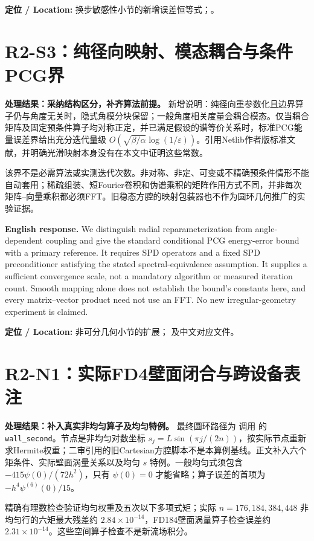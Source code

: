 \noindent\textbf{定位 / Location:} 换步敏感性小节的新增误差恒等式；。

\section{R2-S3：纯径向映射、模态耦合与条件PCG界}
\textbf{处理结果：采纳结构区分，补齐算法前提。}
新增说明：纯径向重参数化且边界算子仍与角度无关时，隐式角模分块保留；一般角度相关度量会耦合模态。仅当耦合矩阵及固定预条件算子均对称正定，并已满足假设的谱等价关系时，标准PCG能量误差界给出充分迭代量级 $O(\sqrt{\beta/\alpha}\log(1/\varepsilon))$。引用Netlib作者版标准文献，并明确光滑映射本身没有在本文中证明这些常数。

该界不是必需算法或实测迭代次数。非对称、非定、可变或不精确预条件情形不能自动套用；稀疏组装、短Fourier卷积和伪谱乘积的矩阵作用方式不同，并非每次矩阵--向量乘积都必须FFT。旧稳态方腔的映射包装器也不作为圆环几何推广的实验证据。

\noindent\textbf{English response.}
We distinguish radial reparameterization from angle-dependent coupling and give the standard conditional PCG energy-error bound with a primary reference. It requires SPD operators and a fixed SPD preconditioner satisfying the stated spectral-equivalence assumption. It supplies a sufficient convergence scale, not a mandatory algorithm or measured iteration count. Smooth mapping alone does not establish the bound's constants here, and every matrix--vector product need not use an FFT. No new irregular-geometry experiment is claimed.

\noindent\textbf{定位 / Location:} 非可分几何小节的扩展； 及中文对应文件。

\section{R2-N1：实际FD4壁面闭合与跨设备表注}
\textbf{处理结果：补入真实非均匀算子及均匀特例。}
最终圆环路径为  调用  的 \texttt{wall\_second}。节点是非均匀对数坐标 $s_j=L\sin(\pi j/(2n))$，按实际节点重新求Hermite权重；二审引用的旧Cartesian方腔脚本不是本算例基线。正文补入六个矩条件、实际壁面涡量关系以及均匀 $s$ 特例。一般均匀式须包含 $-415\psi(0)/(72h^2)$，只有 $\psi(0)=0$ 才能省略；算子误差的首项为 $-h^4\psi^{(6)}(0)/15$。

精确有理数检查验证均匀权重及五次以下多项式矩；实际 $n=176,184,384,448$ 非均匀行的六矩最大残差约 $2.84\times10^{-14}$，FD184壁面涡量算子检查误差约 $2.31\times10^{-14}$。这些空间算子检查不是新流场积分。

